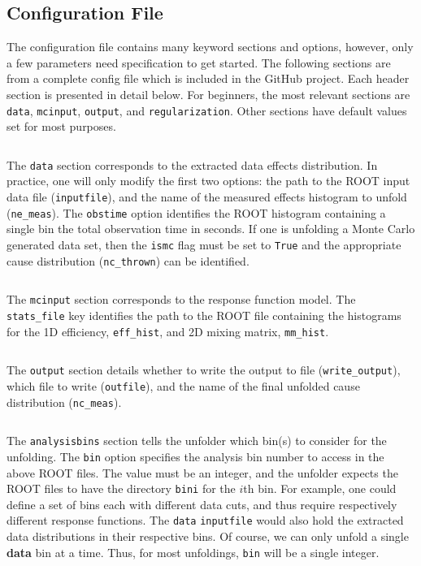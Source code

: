 
\subsection{Configuration File}

The configuration file contains many keyword sections and options, however, only a few parameters need specification to get started.
The following sections are from a complete config file which is included in the GitHub project. 
Each header section is presented in detail below.
For beginners, the most relevant sections are \verb|data|, \verb|mcinput|, \verb|output|, and \verb|regularization|.
Other sections have default values set for most purposes.

\newpage
\noindent\hrulefill

\inputminted[firstline=5,lastline=11]{ini}{config_example.cfg}
The \verb|data| section corresponds to the extracted data effects distribution.
In practice, one will only modify the first two options:
the path to the ROOT input data file (\verb|inputfile|), and the name of the measured effects histogram to unfold (\verb|ne_meas|).
The \verb|obstime| option identifies the ROOT histogram containing a single bin the total observation time in seconds.
If one is unfolding a Monte Carlo generated data set, then the \verb|ismc| flag must be set to \verb|True| and the appropriate cause distribution (\verb|nc_thrown|)
can be identified.

\noindent\hrulefill

\inputminted[firstline=13,lastline=17]{ini}{config_example.cfg}
The \verb|mcinput| section corresponds to the response function model. 
The \verb|stats_file| key identifies the path to the ROOT file containing the histograms for the 1D efficiency, \verb|eff_hist|, and 2D mixing matrix, \verb|mm_hist|.


\noindent\hrulefill

\inputminted[firstline=19,lastline=22]{ini}{config_example.cfg}
The \verb|output| section details whether to write the output to file (\verb|write_output|), which file to write (\verb|outfile|), and the name
of the final unfolded cause distribution (\verb|nc_meas|).

\noindent\hrulefill

\inputminted[firstline=1,lastline=3]{ini}{config_example.cfg}
The \verb|analysisbins| section tells the unfolder which bin(s) to consider for the unfolding. 
The \verb|bin| option specifies the analysis bin number to access in the above ROOT files.
The value must be an integer, and the unfolder expects the ROOT files to have the directory \verb|bini| for the $i$th bin.
For example, one could define a set of bins each with different data cuts, and thus require respectively different response functions.
The \verb|data| \verb|inputfile| would also hold the extracted data distributions in their respective bins.
Of course, we can only unfold a single {\bf data} bin at a time. Thus, for most unfoldings, \verb|bin| will be a single integer.


